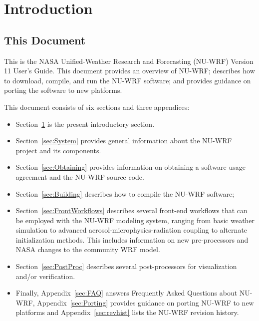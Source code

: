 
\section{Introduction}
\label{sec:Introduction}

\subsection{This Document}
\label{subsec:ThisDocument}
This is the NASA Unified-Weather Research and Forecasting (NU-WRF) Version 11 
User's Guide. This document provides an overview of NU-WRF; describes how to 
download, compile, and run the NU-WRF software; and provides guidance on 
porting the software to new platforms.

This document consists of six sections and three appendices:

\begin{itemize}
\item Section~\ref{sec:Introduction} is the present introductory section.

\item Section~\ref{sec:System} provides general information about the 
NU-WRF project and its components.

\item Section~\ref{sec:Obtaining} provides information on obtaining a
software usage agreement and the NU-WRF source code.

\item Section~\ref{sec:Building} describes how to compile the NU-WRF software;

\item Section~\ref{sec:FrontWorkflows} describes several front-end workflows 
that can be employed with the NU-WRF modeling system, ranging from basic 
weather simulation to advanced aerosol-microphysics-radiation coupling to
alternate initialization methods.  This includes information on new 
pre-processors and NASA changes to the community WRF model.

\item Section~\ref{sec:PostProc} describes several post-processors for 
visualization and/or verification.

\item Finally, Appendix~\ref{sec:FAQ} answers Frequently Asked Questions about
NU-WRF, Appendix~\ref{sec:Porting} provides guidance on porting NU-WRF
to new platforms and Appendix~\ref{sec:revhist} lists the NU-WRF revision history.

\end{itemize}

